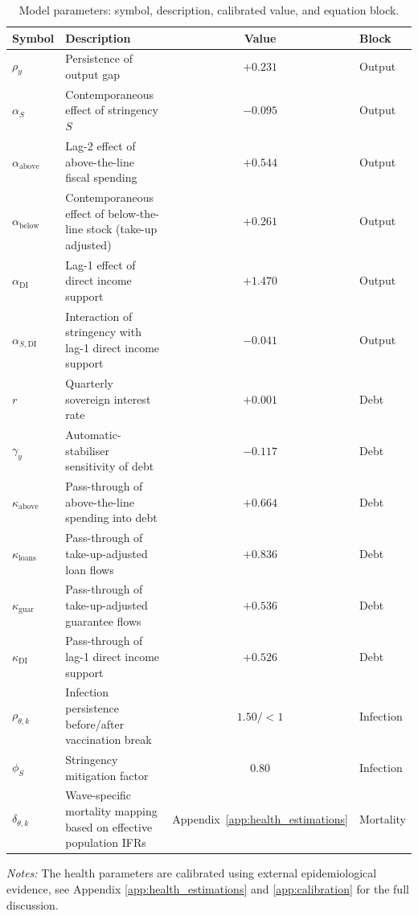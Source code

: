 \documentclass[12pt, a4paper]{article}
\begin{document}
\begin{table}[H]
  \centering
  \caption{Model parameters: symbol, description, calibrated value, and equation block.}
  \label{tab:params}
  \scriptsize

  \begin{tabular}{lp{8cm}cl}
  \toprule
  \textbf{Symbol} & \textbf{Description} & \textbf{Value} & \textbf{Block} \\
  \midrule
  $\rho_y$                 & Persistence of output gap & $+0.231$ & Output \\
  $\alpha_S$               & Contemporaneous effect of stringency $S$ & $-0.095$ & Output \\
  $\alpha_{\text{above}}$  & Lag-2 effect of above-the-line fiscal spending & $+0.544$ & Output \\
  $\alpha_{\text{below}}$  & Contemporaneous effect of below-the-line stock (take-up adjusted) & $+0.261$ & Output \\
  $\alpha_{\text{DI}}$     & Lag-1 effect of direct income support & $+1.470$ & Output \\
  $\alpha_{S,\text{DI}}$   & Interaction of stringency with lag-1 direct income support & $-0.041$ & Output \\
  \midrule
  $r$                      & Quarterly sovereign interest rate & $+0.001$ & Debt \\
  $\gamma_y$               & Automatic-stabiliser sensitivity of debt & $-0.117$ & Debt \\
  $\kappa_{\text{above}}$  & Pass-through of above-the-line spending into debt & $+0.664$ & Debt \\
  $\kappa_{\text{loans}}$  & Pass-through of take-up-adjusted loan flows & $+0.836$ & Debt \\
  $\kappa_{\text{guar}}$   & Pass-through of take-up-adjusted guarantee flows & $+0.536$ & Debt \\
  $\kappa_{\text{DI}}$     & Pass-through of lag-1 direct income support & $+0.526$ & Debt \\
  \midrule
  $\rho_{\theta,k}$        & Infection persistence before/after vaccination break & $1.50/<1$ & Infection \\
  $\phi_S$                 & Stringency mitigation factor & $0.80$ & Infection \\
  $\delta_{\theta,k}$      & Wave-specific mortality mapping based on effective population IFRs & Appendix~\ref{app:health_estimations} & Mortality \\
  \bottomrule
  \end{tabular}
  \vspace{0.15cm}
  \begin{minipage}{0.95\textwidth}
  \scriptsize
  \textit{Notes:} The health parameters are calibrated using external epidemiological evidence, see Appendix \ref{app:health_estimations} and \ref{app:calibration} for the full discussion. 
  \end{minipage}
\end{table}
\end{document}
